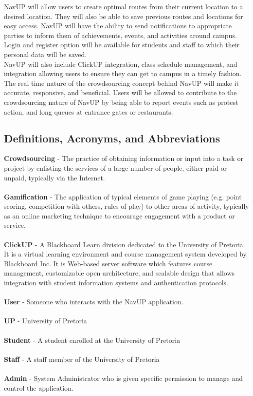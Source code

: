 \documentclass[12pt]{article}
\begin{document}
NavUP will allow users to create optimal routes from their current location to a desired location. They will also be able to save previous routes and locations for easy access. NavUP will have the ability to send notifications to appropriate parties to inform them of achievements, events, and activities around campus. Login and register option will be available for students and staff to which their personal data will be saved.\\

 NavUP will also include ClickUP integration, class schedule management, and integration allowing users to ensure they can get to campus in a timely fashion. 
The real time nature of the crowdsourcing concept behind NavUP will make it accurate, responsive, and beneficial.
Users will be allowed to contribute to the crowdsourcing nature of NavUP by being able to report events such as protest action, and long queues at entrance gates or restaurants.

	\subsection{Definitions, Acronyms, and Abbreviations}
		{\bfseries Crowdsourcing} - The practice of obtaining information or input into a task or project by enlisting the services of a large number of people, either paid or unpaid, typically via the Internet.\\\\
		{\bfseries Gamification} - The application of typical elements of game playing (e.g. point scoring, competition with others, rules of play) to other areas of activity, typically as an online marketing technique to encourage engagement with a product or service.\\\\
		{\bfseries ClickUP} - A Blackboard Learn division dedicated to the University of Pretoria. It is a virtual learning environment and course management system developed by Blackboard Inc. It is Web-based server software which features course management, customizable open architecture, and scalable design that allows integration with student information systems and authentication protocols.\\\\
		{\bfseries User} - Someone who interacts with the NavUP application.\\\\
		{\bfseries UP} - University of Pretoria\\\\
		{\bfseries Student} - A student enrolled at the University of Pretoria\\\\		
		{\bfseries Staff} - A staff member of the University of Pretoria\\\\	
		{\bfseries Admin} - System Administrator who is given specific permission to manage and control the application.
\end{document}
